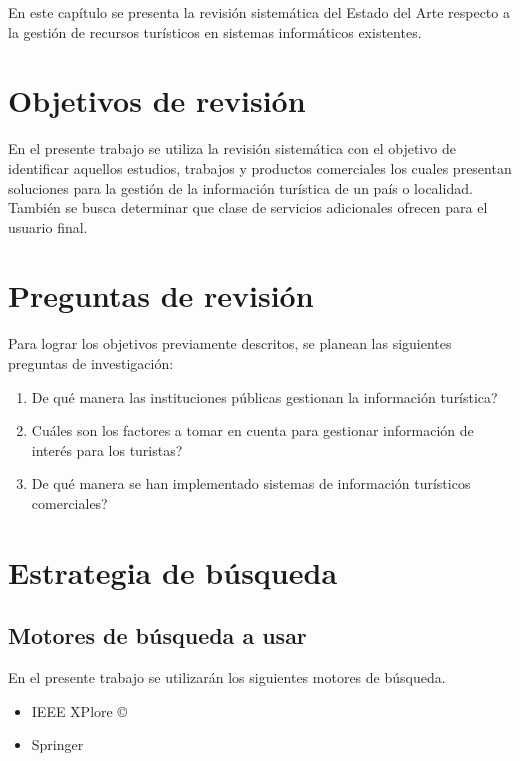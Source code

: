 \documentclass{report}
\begin{document}
En este capítulo se presenta la revisión sistemática del Estado del Arte
respecto a la gestión de recursos turísticos en sistemas informáticos existentes.

\section{Objetivos de revisión}

En el presente trabajo se utiliza la revisión sistemática con el objetivo de
identificar aquellos estudios, trabajos y productos comerciales los cuales presentan
soluciones para la gestión de la información turística de un país o localidad.
También se busca determinar que clase de servicios adicionales ofrecen para el
usuario final.

\section{Preguntas de revisión}

Para lograr los objetivos previamente descritos, se planean las siguientes preguntas
de investigación:

\begin{enumerate}
    \item{De qué manera las instituciones públicas gestionan la información
        turística?}
    \item{Cuáles son los factores a tomar en cuenta para gestionar información
        de interés para los turistas?}
    \item{De qué manera se han implementado sistemas de información turísticos
        comerciales?}
\end{enumerate}

\section{Estrategia de búsqueda}

\subsection{Motores de búsqueda a usar}

En el presente trabajo se utilizarán los siguientes motores de búsqueda.

\begin{itemize}
    \item{IEEE XPlore \copyright{}}
    \item{Springer}
\end{itemize}
\end{document}
